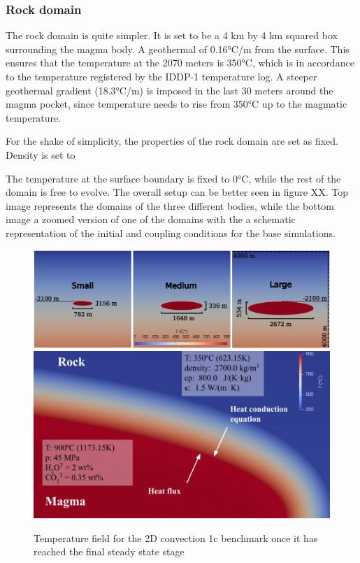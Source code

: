 \subsubsection{Rock domain}
The rock domain is quite simpler. It is set to be a 4 km by 4 km squared box surrounding the magma body. A geothermal of 0.16°C/m from the surface. This ensures that the temperature at the 2070 meters is 350°C, which is in accordance to the temperature registered by the IDDP-1 temperature log. A steeper geothermal gradient (18.3°C/m) is imposed in the last 30 meters around the magma pocket, since temperature needs to rise from 350°C up to the magmatic temperature.

For the shake of simplicity, the properties of the rock domain are set as fixed. Density is set to 

The temperature at the surface boundary is fixed to 0°C, while the rest of the domain is free to evolve.
The overall setup can be better seen in figure XX. Top image represents the domains of the three different bodies, while the bottom image a zoomed version of one of the domains with the a schematic representation of the initial and coupling conditions for the base simulations. 

\begin{figure}
    \centering
    \includegraphics[width=1\linewidth]{img/chapter2/sim_setup/ic_cut.png}
    \includegraphics[width=1\linewidth]{img/chapter2/sim_setup/setup.png}
    \caption{Temperature field for the 2D convection 1c benchmark once it has reached the final steady state stage}
    \label{fig:enter-label}
\end{figure}


